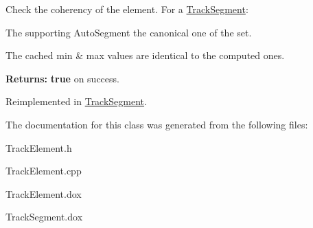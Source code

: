 Check the coherency of the element. For a \mbox{\hyperlink{classKite_1_1TrackSegment}{Track\+Segment}}\+:
\begin{DoxyItemize}
\item The supporting Auto\+Segment the canonical one of the set.
\item The cached {\ttfamily min} \& {\ttfamily max} values are identical to the computed ones.
\end{DoxyItemize}

{\bfseries Returns\+:} {\bfseries true} on success. 

Reimplemented in \mbox{\hyperlink{classKite_1_1TrackSegment_ad79f4c6ea0fe1135b8264a29af085909}{Track\+Segment}}.



The documentation for this class was generated from the following files\+:\begin{DoxyCompactItemize}
\item 
Track\+Element.\+h\item 
Track\+Element.\+cpp\item 
Track\+Element.\+dox\item 
Track\+Segment.\+dox\end{DoxyCompactItemize}
